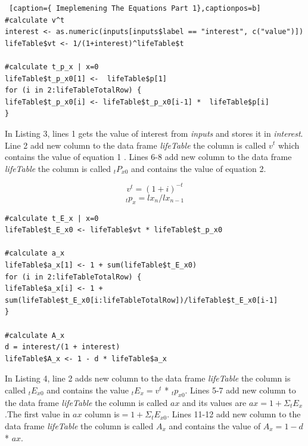 \documentclass[12pt]{article}
\def\StartLineAtOne{\lstset{firstnumber=1}}
\begin{document}
\pagebreak
\StartLineAtOne
\begin{lstlisting} [caption={ Imeplemening The Equations Part 1},captionpos=b]
#calculate v^t
interest <- as.numeric(inputs[inputs$label == "interest", c("value")])
lifeTable$vt <- 1/(1+interest)^lifeTable$t

#calculate t_p_x | x=0
lifeTable$t_p_x0[1] <-  lifeTable$p[1]
for (i in 2:lifeTableTotalRow) {
lifeTable$t_p_x0[i] <- lifeTable$t_p_x0[i-1] *  lifeTable$p[i]
}
\end{lstlisting}
In Listing 3, lines 1 gets the value of interest from \textit{inputs} and stores it in \textit{interest}. Line 2 add new column to the data frame \textit{lifeTable} the column is called $v^{t}$ which contains the value of equation 1 . Lines 6-8 add new column to the data frame \textit{lifeTable} the column is called $_{t}P_{x0}$ and contains the value of equation 2.

\begin{equation}
v^t=(1+i)^{-t}
\end{equation}
\begin{equation}
 _{t}p_{x}=lx_{n}/lx_{n-1}
\end{equation}

\StartLineAtOne
\begin{lstlisting}[caption={Imeplemening The Equations Part 2},captionpos=b]
#calculate t_E_x | x=0
lifeTable$t_E_x0 <- lifeTable$vt * lifeTable$t_p_x0

#calculate a_x
lifeTable$a_x[1] <- 1 + sum(lifeTable$t_E_x0)
for (i in 2:lifeTableTotalRow) {
lifeTable$a_x[i] <- 1 + sum(lifeTable$t_E_x0[i:lifeTableTotalRow])/lifeTable$t_E_x0[i-1]
}

#calculate A_x
d = interest/(1 + interest)
lifeTable$A_x <- 1 - d * lifeTable$a_x
\end{lstlisting}
In Listing 4, line 2 adds new column to the data frame \textit{lifeTable} the column is called $_{t}E_{x0}$ and contains the value $_{t}E_{x}=v^t$ *  $_{t}p_{x0}$. Lines 5-7 add new column to the data frame \textit{lifeTable} the column is called $ax$ and its values are $ax=1+\Sigma _{t}E_{x}$.The first value in  $ax$ column is$=1+\Sigma _{t}E_{x0}$. Lines 11-12 add new column to the data frame \textit{lifeTable} the column is called $A_{x}$ and contains the value of $A_{x}=1-d$ * $ax$.
\end{document}
